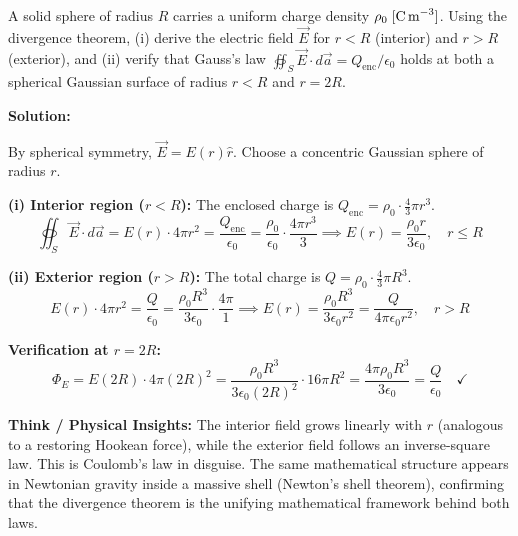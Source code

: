 \begin{psctexample}
A solid sphere of radius $R$ carries a uniform charge density $\rho_0\;[\text{C\,m}^{-3}]$. Using the divergence theorem, (i) derive the electric field $\vec{E}$ for $r < R$ (interior) and $r > R$ (exterior), and (ii) verify that Gauss's law $\oiint_S \vec{E}\cdot d\vec{a} = Q_\text{enc}/\epsilon_0$ holds at both a spherical Gaussian surface of radius $r < R$ and $r = 2R$.

\textbf{Solution:}

By spherical symmetry, $\vec{E} = E(r)\hat{r}$. Choose a concentric Gaussian sphere of radius $r$.

\textbf{(i) Interior region ($r < R$):}
The enclosed charge is $Q_\text{enc} = \rho_0 \cdot \frac{4}{3}\pi r^3$.
\begin{equation}
\oiint_S \vec{E}\cdot d\vec{a} = E(r) \cdot 4\pi r^2 = \frac{Q_\text{enc}}{\epsilon_0} = \frac{\rho_0}{\epsilon_0}\cdot\frac{4\pi r^3}{3}
\implies \boxed{E(r) = \frac{\rho_0 r}{3\epsilon_0}, \quad r \le R}
\end{equation}

\textbf{(ii) Exterior region ($r > R$):}
The total charge is $Q = \rho_0 \cdot \frac{4}{3}\pi R^3$.
\begin{equation}
E(r) \cdot 4\pi r^2 = \frac{Q}{\epsilon_0} = \frac{\rho_0 R^3}{3\epsilon_0}\cdot\frac{4\pi}{1}
\implies \boxed{E(r) = \frac{\rho_0 R^3}{3\epsilon_0 r^2} = \frac{Q}{4\pi\epsilon_0 r^2}, \quad r > R}
\end{equation}

\textbf{Verification at $r = 2R$:}
\begin{equation}
\Phi_E = E(2R)\cdot 4\pi(2R)^2 = \frac{\rho_0 R^3}{3\epsilon_0(2R)^2}\cdot 16\pi R^2 = \frac{4\pi\rho_0 R^3}{3\epsilon_0} = \frac{Q}{\epsilon_0} \quad \checkmark
\end{equation}

\textbf{\color{rbruNavy}Think / Physical Insights:}
The interior field grows linearly with $r$ (analogous to a restoring Hookean force), while the exterior field follows an inverse-square law. This is Coulomb's law in disguise. The same mathematical structure appears in Newtonian gravity inside a massive shell (Newton's shell theorem), confirming that the divergence theorem is the unifying mathematical framework behind both laws.
\qedexam
\end{psctexample}

